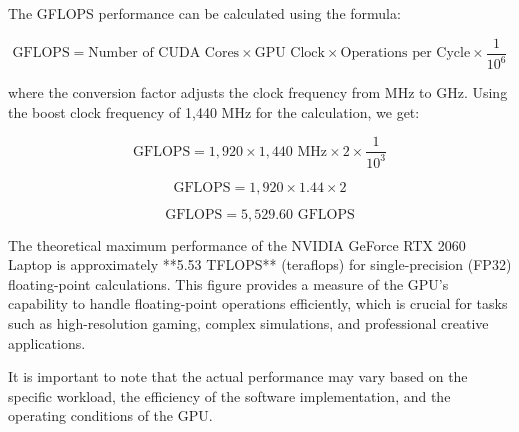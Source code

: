 
The GFLOPS performance can be calculated using the formula:

\[
\text{GFLOPS} = \text{Number of CUDA Cores} \times \text{GPU Clock} \times \text{Operations per Cycle} \times \frac{1}{10^6}
\]

where the conversion factor adjusts the clock frequency from MHz to GHz. Using the boost clock frequency of 1,440 MHz for the calculation, we get:

\[
\text{GFLOPS} = 1,920 \times 1,440 \text{ MHz} \times 2 \times \frac{1}{10^3}
\]

\[
\text{GFLOPS} = 1,920 \times 1.44 \times 2
\]

\[
\text{GFLOPS} = 5,529.60 \text{ GFLOPS}
\]


The theoretical maximum performance of the NVIDIA GeForce RTX 2060 Laptop is approximately **5.53 TFLOPS** (teraflops) for single-precision (FP32) floating-point calculations. This figure provides a measure of the GPU's capability to handle floating-point operations efficiently, which is crucial for tasks such as high-resolution gaming, complex simulations, and professional creative applications.

It is important to note that the actual performance may vary based on the specific workload, the efficiency of the software implementation, and the operating conditions of the GPU.




\newpage
